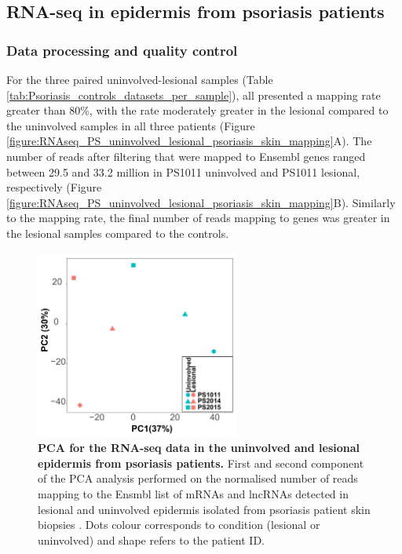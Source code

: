 

\subsection{RNA-seq in epidermis from psoriasis patients}

\subsubsection{Data processing and quality control}
For the three paired uninvolved-lesional samples (Table \ref{tab:Psoriasis_controls_datasets_per_sample}), all presented a mapping rate greater than 80\%, with the rate moderately greater in the lesional compared to the uninvolved samples in all three patients (Figure \ref{figure:RNAseq_PS_uninvolved_lesional_psoriasis_skin_mapping}A). The number of reads after filtering that were mapped to Ensembl genes ranged between 29.5 and 33.2 million in PS1011 uninvolved and PS1011 lesional, respectively (Figure \ref{figure:RNAseq_PS_uninvolved_lesional_psoriasis_skin_mapping}B). Similarly to the mapping rate, the final number of reads mapping to genes was greater in the lesional samples compared to the controls.


\begin{figure}[htbp]
\centering
\includegraphics[width=0.6\textwidth]{./Results2/pdfs/PS_lesional_uninvolved_varied_PCA1and2_plot}
\caption[PCA for the RNA-seq data in the uninvolved and lesional epidermis from psoriasis patients.]{\textbf{PCA for the RNA-seq data in the uninvolved and lesional epidermis from psoriasis patients.} First and second component of the PCA analysis performed on the normalised number of reads mapping to the Ensmbl list of mRNAs and lncRNAs detected in lesional and uninvolved epidermis isolated from psoriasis patient skin biopsies . Dots colour corresponds to condition (lesional or uninvolved) and shape refers to the patient ID.}
\label{figure:RNAseq_PS_lesional_uninvolved_PCA}
\end{figure}

